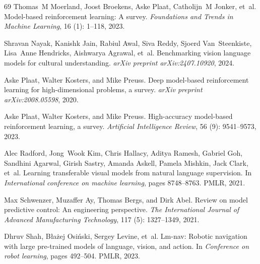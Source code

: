 \begin{thebibliography}{69}
Thomas~M Moerland, Joost Broekens, Aske Plaat, Catholijn~M Jonker, et~al.
\newblock Model-based reinforcement learning: A survey.
\newblock \emph{Foundations and Trends{\textregistered} in Machine Learning}, 16 (1): 1--118, 2023.

Shravan Nayak, Kanishk Jain, Rabiul Awal, Siva Reddy, Sjoerd Van~Steenkiste, Lisa~Anne Hendricks, Aishwarya Agrawal, et~al.
\newblock Benchmarking vision language models for cultural understanding.
\newblock \emph{arXiv preprint arXiv:2407.10920}, 2024.

Aske Plaat, Walter Kosters, and Mike Preuss.
\newblock Deep model-based reinforcement learning for high-dimensional problems, a survey.
\newblock \emph{arXiv preprint arXiv:2008.05598}, 2020.

Aske Plaat, Walter Kosters, and Mike Preuss.
\newblock High-accuracy model-based reinforcement learning, a survey.
\newblock \emph{Artificial Intelligence Review}, 56 (9): 9541--9573, 2023.

Alec Radford, Jong~Wook Kim, Chris Hallacy, Aditya Ramesh, Gabriel Goh, Sandhini Agarwal, Girish Sastry, Amanda Askell, Pamela Mishkin, Jack Clark, et~al.
\newblock Learning transferable visual models from natural language supervision.
\newblock In \emph{International conference on machine learning}, pages 8748--8763. PMLR, 2021.

Max Schwenzer, Muzaffer Ay, Thomas Bergs, and Dirk Abel.
\newblock Review on model predictive control: An engineering perspective.
\newblock \emph{The International Journal of Advanced Manufacturing Technology}, 117 (5): 1327--1349, 2021.

Dhruv Shah, B{\l}a{\.z}ej Osi{\'n}ski, Sergey Levine, et~al.
\newblock Lm-nav: Robotic navigation with large pre-trained models of language, vision, and action.
\newblock In \emph{Conference on robot learning}, pages 492--504. PMLR, 2023.


\end{thebibliography}
